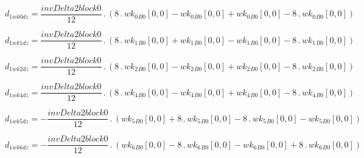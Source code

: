 \documentclass{article}
\begin{document}
\begin{dmath}d_{1 wk0 dz} = \frac{invDelta2block0}{12} \,.\, \left(8 \,.\, {wk_{0}{_{B0}}}[{0,0}] - {wk_{0}{_{B0}}}[{0,0}] + {wk_{0}{_{B0}}}[{0,0}] - 8 \,.\, {wk_{0}{_{B0}}}[{0,0}]\right)\end{dmath}

\begin{dmath}d_{1 wk1 dz} = \frac{invDelta2block0}{12} \,.\, \left(8 \,.\, {wk_{1}{_{B0}}}[{0,0}] + {wk_{1}{_{B0}}}[{0,0}] - {wk_{1}{_{B0}}}[{0,0}] - 8 \,.\, {wk_{1}{_{B0}}}[{0,0}]\right)\end{dmath}

\begin{dmath}d_{1 wk2 dz} = \frac{invDelta2block0}{12} \,.\, \left(8 \,.\, {wk_{2}{_{B0}}}[{0,0}] - {wk_{2}{_{B0}}}[{0,0}] + {wk_{2}{_{B0}}}[{0,0}] - 8 \,.\, {wk_{2}{_{B0}}}[{0,0}]\right)\end{dmath}

\begin{dmath}d_{1 wk4 dz} = \frac{invDelta2block0}{12} \,.\, \left(8 \,.\, {wk_{4}{_{B0}}}[{0,0}] - {wk_{4}{_{B0}}}[{0,0}] + {wk_{4}{_{B0}}}[{0,0}] - 8 \,.\, {wk_{4}{_{B0}}}[{0,0}]\right)\end{dmath}

\begin{dmath}d_{1 wk5 dz} = - \frac{invDelta2block0}{12} \,.\, \left({wk_{5}{_{B0}}}[{0,0}] + 8 \,.\, {wk_{5}{_{B0}}}[{0,0}] - 8 \,.\, {wk_{5}{_{B0}}}[{0,0}] - {wk_{5}{_{B0}}}[{0,0}]\right)\end{dmath}

\begin{dmath}d_{1 wk6 dz} = - \frac{invDelta2block0}{12} \,.\, \left({wk_{6}{_{B0}}}[{0,0}] - 8 \,.\, {wk_{6}{_{B0}}}[{0,0}] - {wk_{6}{_{B0}}}[{0,0}] + 8 \,.\, {wk_{6}{_{B0}}}[{0,0}]\right)\end{dmath}
\end{document}
